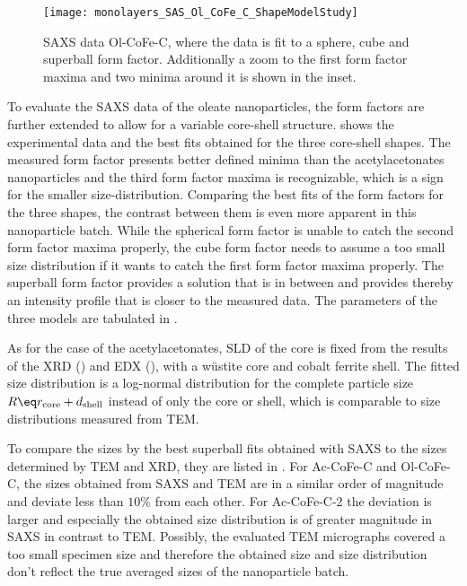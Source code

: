 \documentclass[\main/dresen_thesis.tex]{subfiles}
\begin{document}
    \begin{figure}[tb]
      \centering
      \texttt{[image: monolayers\_SAS\_Ol\_CoFe\_C\_ShapeModelStudy]}
      \caption{\label{fig:monolayers:nanoparticle:sas:OlCoFeC}SAXS data Ol-CoFe-C, where the data is fit to a sphere, cube and superball form factor. Additionally a zoom to the first form factor maxima and two minima around it is shown in the inset.}
    \end{figure}
    To evaluate the SAXS data of the oleate nanoparticles, the form factors are further extended to allow for a variable core-shell structure.
     shows the experimental data and the best fits obtained for the three core-shell shapes.
    The measured form factor presents better defined minima than the acetylacetonates nanoparticles and the third form factor maxima is recognizable, which is a sign for the smaller size-distribution.
    Comparing the best fits of the form factors for the three shapes, the contrast between them is even more apparent in this nanoparticle batch.
    While the spherical form factor is unable to catch the second form factor maxima properly, the cube form factor needs to assume a too small size distribution if it wants to catch the first form factor maxima properly.
    The superball form factor provides a solution that is in between and provides thereby an intensity profile that is closer to the measured data.
    The parameters of the three models are tabulated in .

    As for the case of the acetylacetonates, SLD of the core is fixed from the results of the XRD () and EDX (), with a w\"ustite core and cobalt ferrite shell.
    The fitted size distribution is a log-normal distribution for the complete particle size $R \eq r_\mathrm{core} + d_\mathrm{shell}$ instead of only the core or shell, which is comparable to size distributions measured from TEM.
    
    To compare the sizes by the best superball fits obtained with SAXS to the sizes determined by TEM and XRD, they are listed in .
    For Ac-CoFe-C and Ol-CoFe-C, the sizes obtained from SAXS and TEM are in a similar order of magnitude and deviate less than $10 \%$ from each other.
    For Ac-CoFe-C-2 the deviation is larger and especially the obtained size distribution is of greater magnitude in SAXS in contrast to TEM.
    Possibly, the evaluated TEM micrographs covered a too small specimen size and therefore the obtained size and size distribution don't reflect the true averaged sizes of the nanoparticle batch.
\end{document}
